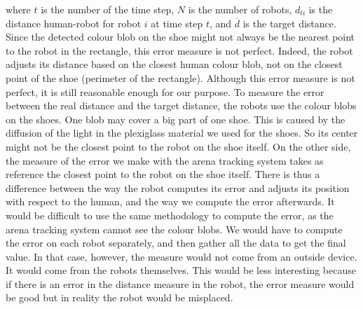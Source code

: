 \documentclass[oneside, a4paper, 12pt]{memoir}
\begin{document}
					 where $t$ is the number of the time step, $N$ is the number of robots, $d_{ti}$ is the distance human-robot for robot $i$ at time step $t$, and $\overline{d}$ is the target distance. Since the detected colour blob on the shoe might not always be the nearest point to the robot in the rectangle, this error measure is not perfect. Indeed, the robot adjusts its distance based on the closest human colour blob, not on the closest point of the shoe (perimeter of the rectangle). Although this error measure is not perfect, it is still reasonable enough for our purpose. To measure the error between the real distance and the target distance, the robots use the colour blobs on the shoes. One blob may cover a big part of one shoe. This is caused by the diffusion of the light in the plexiglass material we used for the shoes. So its center might not be the closest point to the robot on the shoe itself. On the other side, the measure of the error we make with the arena tracking system takes as reference the closest point to the robot on the shoe itself. There is thus a difference between the way the robot computes its error and adjusts its position with respect to the human, and the way we compute the error afterwards. It would be difficult to use the same methodology to compute the error, as the arena tracking system cannot see the colour blobs. We would have to compute the error on each robot separately, and then gather all the data to get the final value. In that case, however, the measure would not come from an outside device. It would come from the robots themselves. This would be less interesting because if there is an error in the distance measure in the robot, the error measure would be good but in reality the robot would be misplaced.
					
\end{document}
